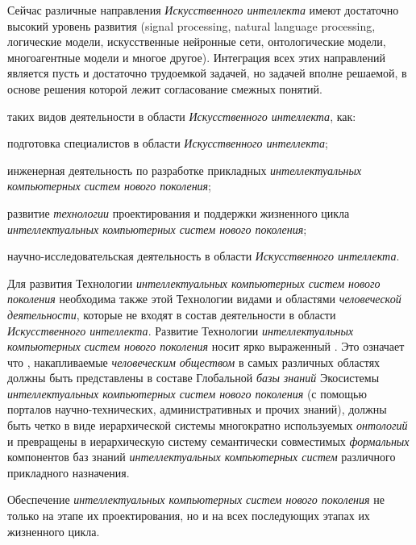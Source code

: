 \begin{textitemize}
	Сейчас различные направления \textit{Искусственного интеллекта} имеют достаточно высокий уровень развития (signal processing, natural language processing, логические модели, искусственные нейронные сети, онтологические модели, многоагентные модели и многое другое). Интеграция всех этих направлений является пусть и достаточно трудоемкой задачей, но задачей вполне решаемой, в основе решения которой лежит согласование смежных понятий.
	\medskip
	\item {} таких видов деятельности в области \textit{Искусственного интеллекта}, как:
	\begin{textitemize}
		\item подготовка специалистов в области \textit{Искусственного интеллекта};
		\item инженерная деятельность по разработке прикладных \textit{интеллектуальных компьютерных систем нового поколения};
		\item развитие \textit{технологии} проектирования и поддержки жизненного цикла \textit{интеллектуальных компьютерных систем нового поколения};
		\item научно-исследовательская деятельность в области \textit{Искусственного интеллекта}.
	\end{textitemize}
	\item Для развития Технологии \textit{интеллектуальных компьютерных систем нового поколения} необходима также  этой Технологии  видами и областями \textit{человеческой деятельности}, которые не входят в состав деятельности в области \textit{Искусственного интеллекта}. Развитие Технологии \textit{интеллектуальных компьютерных систем нового поколения} носит ярко выраженный . Это означает что , накапливаемые \textit{человеческим обществом} в самых различных областях должны быть представлены в составе Глобальной \textit{базы знаний} Экосистемы \textit{интеллектуальных компьютерных систем нового поколения} (с помощью порталов научно-технических, административных и прочих знаний), должны быть четко  в виде иерархической системы  многократно используемых \textit{онтологий} и превращены в иерархическую систему семантически совместимых \textit{формальных} компонентов баз знаний \textit{интеллектуальных компьютерных систем} различного прикладного назначения.
	\medskip
	\item Обеспечение  \textit{интеллектуальных компьютерных систем нового поколения} не только на этапе их проектирования, но и на всех последующих этапах их жизненного цикла.

\end{textitemize}
